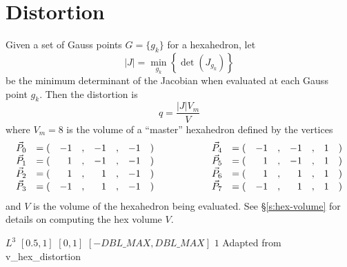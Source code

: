 \section{Distortion} 

Given a set of Gauss points $G=\{g_k\}$ for a hexahedron, let
\[
|J| = \min_{g_k}\left\{\det\left(J_{g_k}\right)\right\}
\]
be the minimum determinant of the Jacobian when evaluated at each Gauss point $g_k$.
Then the distortion is
\[
q = \frac{|J| V_m}{V}  
\]
where $V_m = 8$ is the volume of a ``master'' hexahedron defined by the vertices
\[
\begin{array}{lcrcrcrl}
  \vec P_0 &= (&-1&,&-1&,& -1&)\\
  \vec P_1 &= (& 1&,&-1&,& -1&)\\
  \vec P_2 &= (& 1&,& 1&,& -1&)\\
  \vec P_3 &= (&-1&,& 1&,& -1&)
\end{array}\rule{5em}{0pt}
\begin{array}{lcrcrcrl}
  \vec P_4 &= (&-1&,&-1&,&  1&)\\
  \vec P_5 &= (& 1&,&-1&,&  1&)\\
  \vec P_6 &= (& 1&,& 1&,&  1&)\\
  \vec P_7 &= (&-1&,& 1&,&  1&)
\end{array}
\]
and $V$ is the volume of the hexahedron being evaluated.
See \S\ref{s:hex-volume} for details on computing the hex volume $V$.

%
{$L^3$}%
{$[0.5,1]$}%
{$[0,1]$}%
{$[-DBL\_MAX,DBL\_MAX]$}%
{$1$}%
{Adapted from \cite{ideas:xx}}%
{v\_hex\_distortion}%
